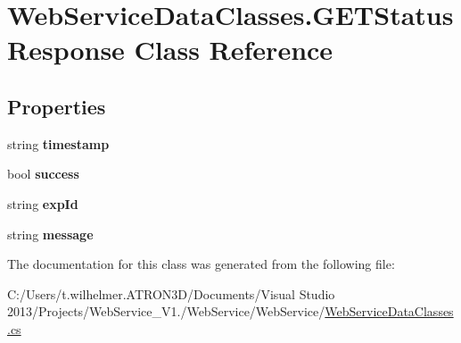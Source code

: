 \hypertarget{class_web_service_data_classes_1_1_g_e_t_status_response}{}\section{Web\+Service\+Data\+Classes.\+G\+E\+T\+Status\+Response Class Reference}
\label{class_web_service_data_classes_1_1_g_e_t_status_response}
\subsection*{Properties}
\begin{DoxyCompactItemize}
\item 
\hypertarget{class_web_service_data_classes_1_1_g_e_t_status_response_a680312b9f55466d32203d06b4fe658da}{}string {\bfseries timestamp}\label{class_web_service_data_classes_1_1_g_e_t_status_response_a680312b9f55466d32203d06b4fe658da}

\item 
\hypertarget{class_web_service_data_classes_1_1_g_e_t_status_response_a8861f8e26e526c26d756e2fa964744cd}{}bool {\bfseries success}\label{class_web_service_data_classes_1_1_g_e_t_status_response_a8861f8e26e526c26d756e2fa964744cd}

\item 
\hypertarget{class_web_service_data_classes_1_1_g_e_t_status_response_a90e5c2f2150f4a664818687d090204bc}{}string {\bfseries exp\+Id}\label{class_web_service_data_classes_1_1_g_e_t_status_response_a90e5c2f2150f4a664818687d090204bc}

\item 
\hypertarget{class_web_service_data_classes_1_1_g_e_t_status_response_a7063a68da800384783a7c17c457802e0}{}string {\bfseries message}\label{class_web_service_data_classes_1_1_g_e_t_status_response_a7063a68da800384783a7c17c457802e0}

\end{DoxyCompactItemize}


The documentation for this class was generated from the following file\+:\begin{DoxyCompactItemize}
\item 
C\+:/\+Users/t.\+wilhelmer.\+A\+T\+R\+O\+N3\+D/\+Documents/\+Visual Studio 2013/\+Projects/\+Web\+Service\+\_\+\+V1./\+Web\+Service/\+Web\+Service/\hyperlink{_web_service_data_classes_8cs}{Web\+Service\+Data\+Classes.\+cs}\end{DoxyCompactItemize}
